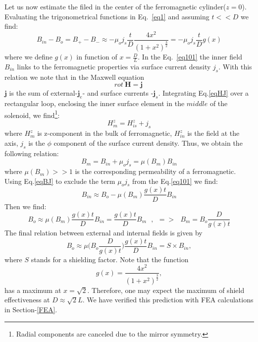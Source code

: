 \documentclass[12pt]{article}
\begin{document}
Let us now estimate the filed in the center of the ferromagnetic cylinder($z=0$).
Evaluating the trigonometrical functions in  Eq.~\ref{eq1} and assuming  $t<<D$
we find:
%
\begin{equation}
B_{in}-B_o = B_+ - B_- \approx - \mu_o j_s  \frac{t}{D} \frac{4x^2} {(1+x^2)^{\frac{3}{2}}}
= - \mu_o j_s \frac{t}{D} g(x)
\label{eq101}
\end{equation}
where we define  $g(x)$ in  function of  $x=\frac{D}{L}$.
In the Eq.~\ref{eq101} the inner field $B_{in}$
links to the  ferromagnetic properties 
via surface current density  $j_s$. With this 
relation we note that in  the Maxwell equation
\begin{equation}
rot~\textbf{H} = \textbf{j} ~
\label{eqHJ}
\end{equation}
$\textbf{j}$ %
is the sum of external-$\textbf{j}_e$-  and
surface   currents -$\textbf{j}_s$.
Integrating Eq.\ref{eqHJ} over a rectangular loop, enclosing the inner surface element 
in the $middle$ of the solenoid, we find\footnote{Radial components are canceled due to the mirror symmetry.}:
%
\begin{equation}
                  H_m^z =H_{is}^z+j_s
\label{eqBJ1}
\end{equation}
%
where $H_m^z$ is   z-component  in the bulk of   ferromagnetic,
$H_{in}^z$ is the field at the  axis, 
$j_s$ is the $\phi$ component of the surface current density.
Thus,  we obtain the following  relation:
%
\begin{equation}
B_m = B_{in}+\mu_o j_s=\mu(B_m)B_{in}   %
\label{eqBJ}
\end{equation}
%
where $\mu(B_m)>>1$ is the corresponding permeability  of a  ferromagnetic.
Using  Eq.\ref{eqBJ}  to exclude  the term  %
$\mu_o j_s$ from the Eq.\ref{eq101} we find:
%
\begin{equation}
B_{in}\approx B_o - \mu(B_m)  \frac{g(x)t}{D}  B_{in}
\label{eq11}
\end{equation}
%
Then we find:
%
\begin{equation}
B_{o}\approx
\mu(B_m)\frac{g(x)t}{D} B_{in}=
\frac{g(x)t}{D}B_{m}~~~, ~~ => ~~~B_{m}=B_o\frac{D}{g(x)t}
\label{eq12}
\end{equation}
%
The final relation between external and internal fields is given by
%
\begin{equation}
B_o \approx \mu\bigg(B_o 
\frac{D}{g(x)t}\bigg) \frac{g(x)t }{D} B_{in}=S \times B_{in} ,
\label{eqfinal}
\end{equation}
%
where $S$ stands for a shielding factor.
Note that  the function
%
\begin{equation}
 g(x)=\frac{4x^2}{(1+x^2)^{\frac{3}{2}}},
\label{sf01}
\end{equation}
has a maximum at $x=\sqrt2$. Therefore, one may  expect the maximum of shield
effectiveness at $D \approx \sqrt2L$.  We have verified this prediction  with 
FEA calculations in Section-\ref{FEA}.
\end{document}
